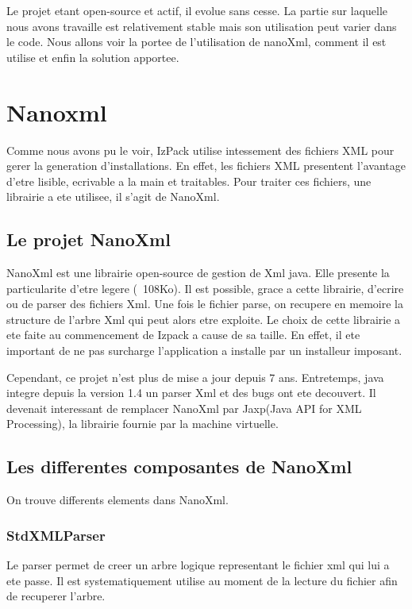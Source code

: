 Le projet etant open-source et actif, il evolue sans cesse. La partie sur laquelle nous avons travaille est relativement stable mais son utilisation peut varier dans le code. Nous allons voir la portee de l'utilisation de nanoXml, comment il est utilise et enfin la solution apportee.

\section{Nanoxml}
Comme nous avons pu le voir, IzPack utilise intessement des fichiers XML pour gerer la generation d'installations. En effet, les fichiers XML presentent l'avantage d'etre lisible, ecrivable a la main et traitables. Pour traiter ces fichiers, une librairie a ete utilisee, il s'agit de NanoXml.
\subsection{Le projet NanoXml}
NanoXml est une librairie open-source de gestion de Xml java. Elle presente la particularite d'etre legere (~108Ko). Il est possible, grace a cette librairie, d'ecrire ou de parser des fichiers Xml. Une fois le fichier parse, on recupere en memoire la structure de l'arbre Xml qui peut alors etre exploite. Le choix de cette librairie a ete faite au commencement de Izpack a cause de sa taille. En effet, il ete important de ne pas surcharge l'application a installe par un installeur imposant. 

Cependant, ce projet n'est plus de mise a jour depuis 7 ans. Entretemps, java integre depuis la version 1.4 un parser Xml et des bugs ont ete decouvert. Il devenait interessant de remplacer NanoXml par Jaxp(Java API for XML Processing), la librairie fournie par la machine virtuelle.
\subsection{Les differentes composantes de NanoXml}
On trouve differents elements dans NanoXml.
\subsubsection{StdXMLParser}
Le parser permet de creer un arbre logique representant le fichier xml qui lui a ete passe. Il est systematiquement utilise au moment de la lecture du fichier afin de recuperer l'arbre.
